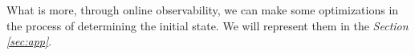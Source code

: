 What is more, through online observability, we can make some optimizations in the process of determining the initial state. We will represent them in the {\em Section \ref{sec:app}}.
   
   
